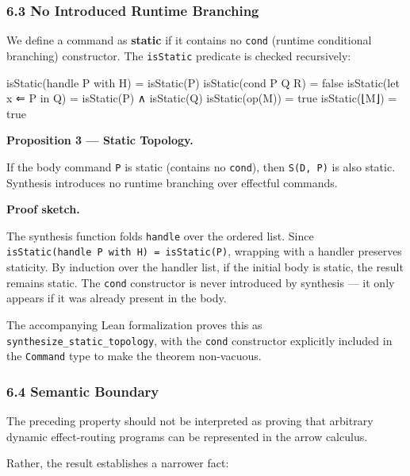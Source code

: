 \documentclass[
  11pt,
]{article}
\newenvironment{Shaded}{}{}
\newcommand{\NormalTok}[1]{#1}
\begin{document}
\subsubsection{6.3 No Introduced Runtime
Branching}\label{no-introduced-runtime-branching}

We define a command as \textbf{static} if it contains no \texttt{cond}
(runtime conditional branching) constructor. The \texttt{isStatic}
predicate is checked recursively:

\begin{Shaded}
\begin{Highlighting}[]
\NormalTok{isStatic(handle P with H) = isStatic(P)}
\NormalTok{isStatic(cond P Q R)      = false}
\NormalTok{isStatic(let x ⇐ P in Q)  = isStatic(P) ∧ isStatic(Q)}
\NormalTok{isStatic(op(M))           = true}
\NormalTok{isStatic(⌊M⌋)             = true}
\end{Highlighting}
\end{Shaded}

\textbf{Proposition 3 --- Static Topology.}

If the body command \texttt{P} is static (contains no \texttt{cond}),
then \texttt{S(D,\ P)} is also static. Synthesis introduces no runtime
branching over effectful commands.

\textbf{Proof sketch.}

The synthesis function folds \texttt{handle} over the ordered list.
Since \texttt{isStatic(handle\ P\ with\ H)\ =\ isStatic(P)}, wrapping
with a handler preserves staticity. By induction over the handler list,
if the initial body is static, the result remains static. The
\texttt{cond} constructor is never introduced by synthesis --- it only
appears if it was already present in the body.

The accompanying Lean formalization proves this as
\texttt{synthesize\_static\_topology}, with the \texttt{cond}
constructor explicitly included in the \texttt{Command} type to make the
theorem non-vacuous.

\subsubsection{6.4 Semantic Boundary}\label{semantic-boundary}

The preceding property should not be interpreted as proving that
arbitrary dynamic effect-routing programs can be represented in the
arrow calculus.

Rather, the result establishes a narrower fact:
\end{document}
